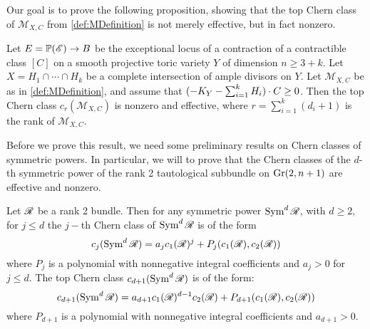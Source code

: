 Our goal is to prove the following proposition, showing that the top Chern class of $\mathscr{M}_{X,C}$ from \cref{def:MDefinition} is not merely effective, but in fact nonzero.
\begin{proposition}
	\label{prop:PermutationPositive}
	Let $E = \mathbb{P}(\mathscr{E}) \to B$ be the exceptional locus of a contraction of a contractible class $[C]$ on a smooth projective toric variety $Y$ of dimension $n \geq 3+k$. Let $X = H_1 \cap \cdots \cap H_k$ be a complete intersection of ample divisors on $Y$. Let $\mathscr{M}_{X,C}$ be as in \cref{def:MDefinition}, and assume that $(-K_Y - \sum_{i=1}^k H_i) \cdot C \geq 0$. Then the top Chern class $c_r(\mathscr{M}_{X,C})$ is nonzero and effective, where $r=\sum_{i=1}^k(d_i+1)$ is the rank of $\mathscr{M}_{X,C}$.
\end{proposition}
Before we prove this result, we need some preliminary results on Chern classes of symmetric powers. In particular, we will to prove that the Chern classes of the $d$-th symmetric power of the rank 2 tautological subbundle on $\operatorname{Gr}(2,n+1)$ are effective and nonzero.
\begin{lemma}
	\label{prop:EffectiveSymProdChern}
	Let $\mathscr{R}$ be a rank 2 bundle. Then for any symmetric power $\operatorname{Sym}^d \mathscr{R}$, with $d \geq 2$, for $j \leq d$ the $j-$th Chern class of $\operatorname{Sym}^d \mathscr{R}$ is of the form
	\[c_j(\operatorname{Sym}^d \mathscr{R}) = a_j c_1(\mathscr{R})^j + P_j(c_1(\mathscr{R}),c_2(\mathscr{R})) \]
	where $P_j$ is a polynomial with nonnegative integral coefficients and $a_j > 0$ for $j\leq d$. The top Chern class $c_{d+1}(\operatorname{Sym}^d \mathscr{R})$ is of the form:
	\[c_{d+1}(\operatorname{Sym}^d \mathscr{R}) = a_{d+1} c_1(\mathscr{R})^{d-1}c_2(\mathscr{R}) + P_{d+1}(c_1(\mathscr{R}),c_2(\mathscr{R}))\]
	where $P_{d+1}$ is a polynomial with nonnegative integral coefficients and $a_{d+1} > 0$.
\end{lemma}
